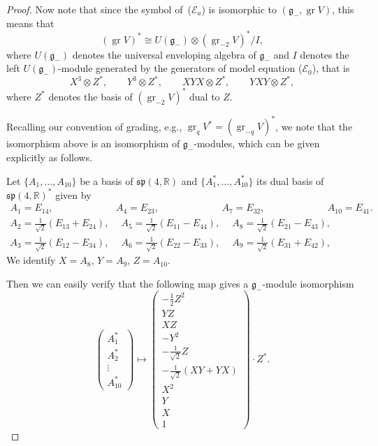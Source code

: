 \documentclass[pdftex]{sigma}%
\newcommand{\R}{\mathbb R}
\newcommand{\E}{\mathcal E}
\newcommand{\g}{\mathfrak g}
\newcommand{\fsp}{\mathfrak{sp}}
\newcommand{\gr}{\operatorname{gr}}
\numberwithin{equation}{section}
\begin{document}
\begin{proof}
	Now note that since the symbol of~($\E_a$) is isomorphic to $(\g_{-}, \gr V)$, this means that
	\[
		(\gr V)^* \cong U(\g_{-})\otimes (\gr_{-2} V)^*/I,
	\]
	where $U(\g_{-})$ denotes the universal enveloping algebra of $\g_{-}$ and $I$ denotes the left $U(\g_{-})$-module generated by the generators of model equation ($\E_0$), that is
	\[
		X^3\otimes Z^*,\qquad Y^3\otimes Z^*,\qquad XYX\otimes Z^*,\qquad YXY\otimes Z^*,
	\]
	where $Z^*$ denotes the basis of $(\gr_{-2} V)^*$ dual to $Z$.
	
	Recalling our convention of grading, e.g., $\gr_q V^*=(\gr_{-q} V)^*$, we note that the isomorphism above is an isomorphism of $\g_{-}$-modules, which can be given explicitly as follows.
	
	Let $\{A_1,\dots, A_{10}\}$ be a basis of $\fsp(4,\R)$ and $\{A_1^*,\dots,A_{10}^*\}$ its dual basis of $\fsp(4,\R)^*$ given by	
\begin{gather*}
A_1 = E_{14},\ \quad\qquad\qquad\quad\, A_4 =E_{23},\ \quad\qquad\qquad\quad\,
A_7 =E_{32} ,\ \quad\qquad\qquad\quad\, A_{10} = E_{41}.
\\
A_2 = \frac{1}{\sqrt{2}}(E_{13}+E_{24}),\quad \ A_5 =\frac{1}{\sqrt{2}}(E_{11}-E_{44}),\quad \
A_8 = \frac{1}{\sqrt{2}}(E_{21}-E_{43}) ,
\\
A_3 = \frac{1}{\sqrt{2}}(E_{12}-E_{34}),\quad\ A_6 = \frac{1}{\sqrt{2}}(E_{22}-E_{33}), \quad \
A_9 = \frac{1}{\sqrt{2}}(E_{31}+E_{42}),
\end{gather*}
	We identify $X=A_8$, $Y=A_9$, $Z=A_{10}$.
	
	Then we can easily verify that the following map gives a $\g_{-}$-module isomorphism
	\[
		\begin{pmatrix} A_1^* \\ A_2^* \\ \vdots \\ A_{10}^*
		\end{pmatrix}
		\mapsto
	 \begin{pmatrix}
		-\frac{1}{2}Z^2 \\
		YZ \\
		XZ \\
		-Y^2 \\
		-\frac{1}{\sqrt{2}}Z\\
		-\frac{1}{\sqrt{2}}(XY+YX)\\
		X^2\\
		Y \\
		X\\
		1
		\end{pmatrix} \cdot Z^* .
	\]
	

\end{proof}
\end{document}
